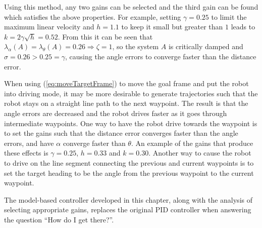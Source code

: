 Using this method, any two gains can be selected and the third gain can be found which satisfies the above properties. For example, setting $\gamma=0.25$ to limit the maximum linear velocity and $h=1.1$ to keep it small but greater than $1$ leads to $k=2\gamma\sqrt{h}=0.52$. From this it can be seen that $\lambda_\alpha(A) = \lambda_\theta(A) = 0.26 \Rightarrow \zeta = 1$, so the system $A$ is critically damped and $\sigma = 0.26>0.25=\gamma$, causing the angle errors to converge faster than the distance error.

When using (\ref{eq:moveTargetFrame}) to move the goal frame and put the robot into driving mode, it may be more desirable to generate trajectories such that the robot stays on a straight line path to the next waypoint. The result is that the angle errors are decreased and the robot drives faster as it goes through intermediate waypoints. One way to have the robot drive towards the waypoint is to set the gains such that the distance error converges faster than the angle errors, and have $\alpha$ converge faster than $\theta$. An example of the gains that produce these effects is $\gamma=0.25$, $h=0.33$ and $k=0.30$. Another way to cause the robot to drive on the line segment connecting the previous and current waypoints is to set the target heading to be the angle from the previous waypoint to the current waypoint.

The model-based controller developed in this chapter, along with the analysis of selecting appropriate gains, replaces the original PID controller when answering the question ``How do I get there?''.
